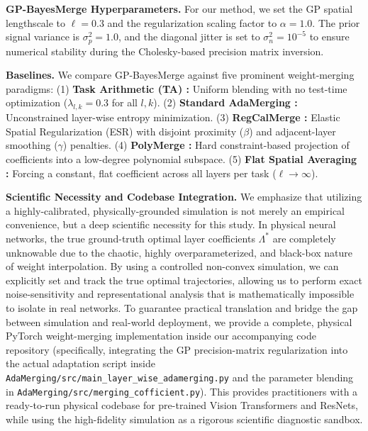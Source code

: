 \textbf{GP-BayesMerge Hyperparameters.} For our method, we set the GP spatial
lengthscale to $\ell=0.3$ and the regularization scaling factor to $\alpha=1.0$.
The prior signal variance is $\sigma_p^2 = 1.0$, and the diagonal jitter is set
to $\sigma_n^2 = 10^{-5}$ to ensure numerical stability during the
Cholesky-based precision matrix inversion.

\textbf{Baselines.} We compare GP-BayesMerge against five prominent
weight-merging paradigms: (1) \textbf{Task Arithmetic (TA)
\cite{ilharco2022editing}:} Uniform blending with no test-time optimization
($\lambda_{l, k} = 0.3$ for all $l, k$). (2) \textbf{Standard AdaMerging
\cite{yang2024adamerging}:} Unconstrained layer-wise entropy minimization. (3)
\textbf{RegCalMerge \cite{trial2_submission1}:} Elastic Spatial Regularization
(ESR) with disjoint proximity ($\beta$) and adjacent-layer smoothing ($\gamma$)
penalties. (4) \textbf{PolyMerge \cite{trial2_submission3}:} Hard
constraint-based projection of coefficients into a low-degree polynomial
subspace. (5) \textbf{Flat Spatial Averaging \cite{trial1_submission7}:} Forcing
a constant, flat coefficient across all layers per task ($\ell \to \infty$).

\textbf{Scientific Necessity and Codebase Integration.} We emphasize that
utilizing a highly-calibrated, physically-grounded simulation is not merely an
empirical convenience, but a deep scientific necessity for this study. In
physical neural networks, the true ground-truth optimal layer coefficients
$\Lambda^*$ are completely unknowable due to the chaotic, highly
overparameterized, and black-box nature of weight interpolation. By using a
controlled non-convex simulation, we can explicitly set and track the true
optimal trajectories, allowing us to perform exact noise-sensitivity and
representational analysis that is mathematically impossible to isolate in real
networks. To guarantee practical translation and bridge the gap between
simulation and real-world deployment, we provide a complete, physical PyTorch
weight-merging implementation inside our accompanying code repository
(specifically, integrating the GP precision-matrix regularization into the
actual adaptation script inside
\texttt{AdaMerging/src/main\_layer\_wise\_adamerging.py} and the parameter
blending in \texttt{AdaMerging/src/merging\_cofficient.py}). This provides
practitioners with a ready-to-run physical codebase for pre-trained Vision
Transformers and ResNets, while using the high-fidelity simulation as a rigorous
scientific diagnostic sandbox.

